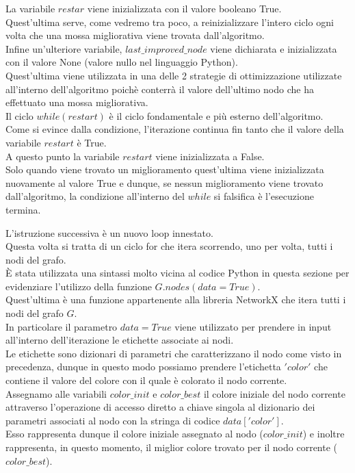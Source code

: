 La variabile $restar$ viene inizializzata con il valore booleano True.\\
Quest'ultima serve, come vedremo tra poco, a reinizializzare l'intero ciclo ogni volta che una mossa migliorativa viene trovata dall'algoritmo.\\

Infine un'ulteriore variabile, $last\_improved\_node$ viene dichiarata e inizializzata con il valore None (valore nullo nel linguaggio Python).\\
Quest'ultima viene utilizzata in una delle 2 strategie di ottimizzazione utilizzate all'interno dell'algoritmo poichè conterrà il valore dell'ultimo nodo che ha effettuato una mossa migliorativa.\\

Il ciclo $while(restart)$ è il ciclo fondamentale e più esterno dell'algoritmo.\\
Come si evince dalla condizione, l'iterazione continua fin tanto che il valore della variabile $restart$ è True.\\

A questo punto la variabile $restart$ viene inizializzata a False.\\
Solo quando viene trovato un miglioramento quest'ultima viene inizializzata nuovamente al valore True e dunque, se nessun miglioramento viene trovato dall'algoritmo, la condizione all'interno del $while$ si falsifica è l'esecuzione termina.

L'istruzione successiva è un nuovo loop innestato.\\ Questa volta si tratta di un ciclo for che itera scorrendo, uno per volta, tutti i nodi del grafo.\\
È stata utilizzata una sintassi molto vicina al codice Python in questa sezione per evidenziare l'utilizzo della funzione $G.nodes(data=True)$.\\
Quest'ultima è una funzione appartenente alla libreria NetworkX che itera tutti i nodi del grafo $G$.\\
In particolare il parametro $data=True$ viene utilizzato per prendere in input all'interno dell'iterazione le etichette associate ai nodi.\\
Le etichette sono dizionari di parametri che caratterizzano il nodo come visto in precedenza, dunque in questo modo possiamo prendere l'etichetta $'color'$ che contiene il valore del colore con il quale è colorato il nodo corrente.\\

Assegnamo alle variabili $color\_init$ e $color\_best$ il colore iniziale del nodo corrente attraverso l'operazione di accesso diretto a chiave singola al dizionario dei parametri associati al nodo con la stringa di codice $data['color']$.\\
Esso rappresenta dunque il colore iniziale assegnato al nodo ($color\_init$) e inoltre rappresenta, in questo momento, il miglior colore trovato per il nodo corrente ($color\_best$).\\

